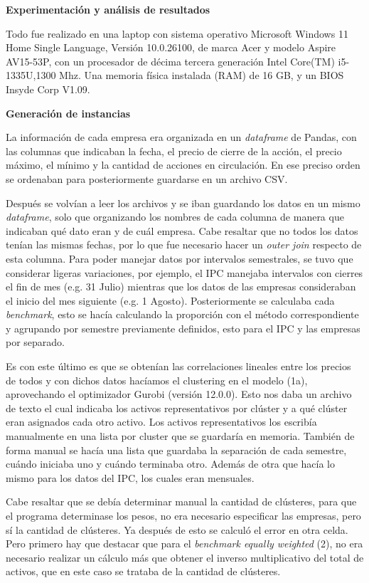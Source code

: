 \documentclass[
]{article}
\begin{document}
\textbf{Experimentación y análisis de resultados}

Todo fue realizado en una laptop con sistema operativo Microsoft Windows
11 Home Single Language, Versión 10.0.26100, de marca Acer y modelo
Aspire AV15-53P, con un procesador de décima tercera generación Intel
Core(TM) i5-1335U,1300 Mhz. Una memoria física instalada (RAM) de 16 GB,
y un BIOS Insyde Corp V1.09.

\textbf{Generación de instancias}

La información de cada empresa era organizada en un \emph{dataframe} de Pandas, con las columnas
que indicaban la fecha, el precio de cierre de la acción, el precio máximo, el mínimo
y la cantidad de acciones en circulación. En ese preciso orden se ordenaban para
posteriormente guardarse en un archivo CSV.

Después se volvían a leer los archivos y se iban guardando los datos en un mismo
\emph{dataframe}, solo que organizando los nombres de cada columna de manera que
indicaban qué dato eran y de cuál empresa. Cabe resaltar que no todos los datos tenían
las mismas fechas, por lo que fue necesario hacer un \emph{outer join} respecto de esta columna.
Para poder manejar datos por intervalos semestrales, se tuvo que considerar ligeras variaciones, por
ejemplo, el IPC manejaba intervalos con cierres el fin de mes (e.g. 31 Julio) mientras que los datos
de las empresas consideraban el inicio del mes siguiente (e.g. 1 Agosto). Posteriormente se calculaba cada \emph{benchmark}, esto se hacía calculando la proporción con
el método correspondiente y agrupando por semestre previamente definidos, esto para el IPC y las empresas
por separado.

Es con este último es que se obtenían las correlaciones lineales entre los precios
de todos y con dichos datos hacíamos el clustering en el modelo (1a), aprovechando 
el optimizador Gurobi (versión 12.0.0). Esto nos daba un
archivo de texto el cual indicaba los activos representativos por clúster y a qué
clúster eran asignados cada otro activo. Los activos representativos los escribía
manualmente en una lista por cluster que se guardaría en memoria. También de
forma manual se hacía una lista que guardaba la separación de cada semestre,
cuándo iniciaba uno y cuándo terminaba otro. Además de otra que hacía lo mismo
para los datos del IPC, los cuales eran mensuales.

Cabe resaltar que se debía determinar manual la cantidad de clústeres, para que el
programa determinase los pesos, no era necesario especificar las empresas, pero
sí la cantidad de clústeres. Ya después de esto se calculó el error en otra
celda. Pero primero hay que destacar que para el \emph{benchmark equally weighted} 
(2), no era necesario realizar un cálculo más que obtener el inverso multiplicativo
del total de activos, que en este caso se trataba de la cantidad de clústeres.
\end{document}
